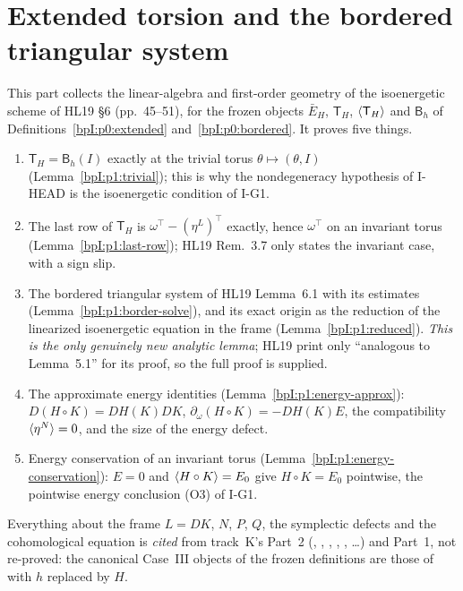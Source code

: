 \section{Extended torsion and the bordered triangular system}\label{bpI:p1}

This part collects the linear-algebra and first-order geometry of the isoenergetic scheme of HL19
\S6 (pp.~45--51), for the frozen objects $\bar E_H$, $\mathsf T_H$, $\langle \mathsf T_H\rangle$ and $\mathsf B_h$
of Definitions~\ref{bpI:p0:extended} and~\ref{bpI:p0:bordered}. It proves five things.
\begin{enumerate}[label=(\arabic*)]
\item $\mathsf T_H=\mathsf B_h(I)$ exactly at the trivial torus $\theta\mapsto(\theta,I)$
  (Lemma~\ref{bpI:p1:trivial}); this is why the nondegeneracy hypothesis of I-HEAD is the isoenergetic
  condition of I-G1.
\item The last row of $\mathsf T_H$ is $\omega^\top-(\eta^L)^\top$ exactly, hence $\omega^\top$ on an invariant
  torus (Lemma~\ref{bpI:p1:last-row}); HL19 Rem.~3.7 only states the invariant case, with a sign slip.
\item The bordered triangular system of HL19 Lemma~6.1 with its estimates (Lemma~\ref{bpI:p1:border-solve}),
  and its exact origin as the reduction of the linearized isoenergetic equation in the frame
  (Lemma~\ref{bpI:p1:reduced}). \emph{This is the only genuinely new analytic lemma}; HL19 print only
  ``analogous to Lemma~5.1'' for its proof, so the full proof is supplied.
\item The approximate energy identities (Lemma~\ref{bpI:p1:energy-approx}): $D(H\circ K)=DH(K)DK$,
  $\partial_\omega(H\circ K)=-DH(K)E$, the compatibility $\langle \eta^N\rangle=0$, and the size of the energy defect.
\item Energy conservation of an invariant torus (Lemma~\ref{bpI:p1:energy-conservation}): $E=0$ and
  $\langle H\circ K\rangle=E_0$ give $H\circ K=E_0$ pointwise, the pointwise energy conclusion (O3) of I-G1.
\end{enumerate}
Everything about the frame $L=DK$, $N$, $P$, $Q$, the symplectic defects and the cohomological equation is
\emph{cited} from track~K's Part~2 (, ,
, , , \dots) and Part~1, not
re-proved: the canonical Case~III objects of the frozen definitions are those of
 with $h$ replaced by $H$.

